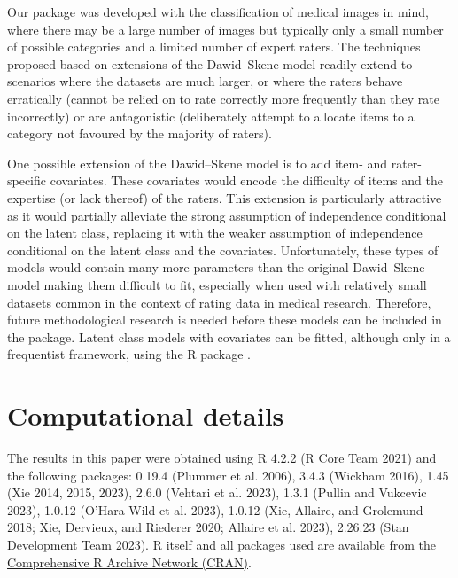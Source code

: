 Our package was developed with the classification of medical images in mind,
where there may be a large number of images but
typically only a small number of possible categories and a limited number of
expert raters. The techniques proposed based on extensions of the Dawid--Skene model
readily extend to scenarios where the datasets are much larger, or where the
raters behave erratically (cannot be relied on to rate correctly more
frequently than they rate incorrectly) or are antagonistic (deliberately
attempt to allocate items to a category not favoured by the majority of
raters).

One possible extension of the Dawid--Skene model is to add item- and
rater-specific covariates. These covariates would encode the difficulty of
items and the expertise (or lack thereof) of the raters. This extension is
particularly attractive as it would partially alleviate the strong assumption
of independence conditional on the latent class, replacing it with the weaker
assumption of independence conditional on the latent class and the covariates.
Unfortunately, these types of models would contain many more parameters than
the original Dawid--Skene model making them difficult to fit, especially when
used with relatively small datasets common in the context of rating data in
medical research. Therefore, future methodological research is needed before
these models can be included in the  package. Latent class
models with covariates can be fitted, although only in a frequentist framework,
using the R package .

\hypertarget{computational-details}{%
\section{Computational details}\label{computational-details}}

The results in this paper were obtained using
R 4.2.2 (R Core Team 2021)
and the following packages:
 0.19.4 (Plummer et al. 2006),
 3.4.3 (Wickham 2016),
 1.45 (Xie 2014, 2015, 2023),
 2.6.0 (Vehtari et al. 2023),
 1.3.1 (Pullin and Vukcevic 2023),
 1.0.12 (O'Hara-Wild et al. 2023),
 1.0.12 (Xie, Allaire, and Grolemund 2018; Xie, Dervieux, and Riederer 2020; Allaire et al. 2023),
 2.26.23 (Stan Development Team 2023).
R itself and all packages used are available from the \href{https://CRAN.R-project.org/}{Comprehensive R Archive
Network (CRAN)}.


